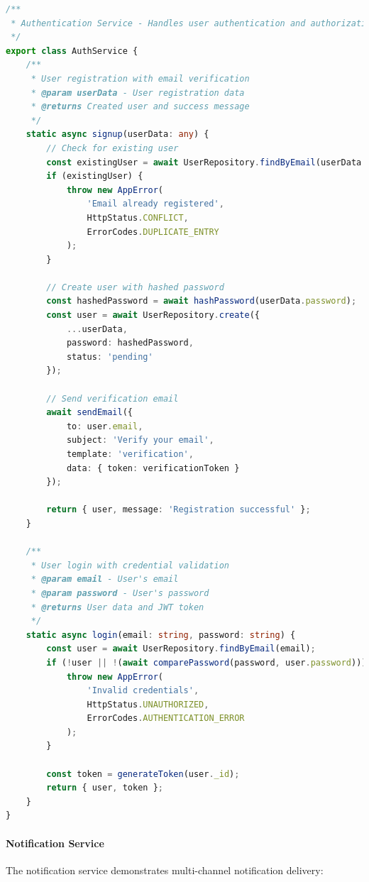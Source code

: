 \begin{lstlisting}[language=TypeScript, caption={Authentication Service Implementation}]
/**
 * Authentication Service - Handles user authentication and authorization
 */
export class AuthService {
    /**
     * User registration with email verification
     * @param userData - User registration data
     * @returns Created user and success message
     */
    static async signup(userData: any) {
        // Check for existing user
        const existingUser = await UserRepository.findByEmail(userData.email);
        if (existingUser) {
            throw new AppError(
                'Email already registered',
                HttpStatus.CONFLICT,
                ErrorCodes.DUPLICATE_ENTRY
            );
        }

        // Create user with hashed password
        const hashedPassword = await hashPassword(userData.password);
        const user = await UserRepository.create({
            ...userData,
            password: hashedPassword,
            status: 'pending'
        });

        // Send verification email
        await sendEmail({
            to: user.email,
            subject: 'Verify your email',
            template: 'verification',
            data: { token: verificationToken }
        });

        return { user, message: 'Registration successful' };
    }

    /**
     * User login with credential validation
     * @param email - User's email
     * @param password - User's password
     * @returns User data and JWT token
     */
    static async login(email: string, password: string) {
        const user = await UserRepository.findByEmail(email);
        if (!user || !(await comparePassword(password, user.password))) {
            throw new AppError(
                'Invalid credentials',
                HttpStatus.UNAUTHORIZED,
                ErrorCodes.AUTHENTICATION_ERROR
            );
        }

        const token = generateToken(user._id);
        return { user, token };
    }
}
\end{lstlisting}

\paragraph{Notification Service}
The notification service demonstrates multi-channel notification delivery:

